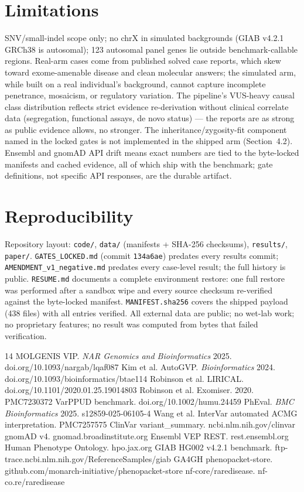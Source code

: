 \documentclass[11pt]{article}
\begin{document}
\section{Limitations}
\label{sec:limits}
SNV/small-indel scope only; no chrX in simulated backgrounds (GIAB v4.2.1 GRCh38 is
autosomal); 123 autosomal panel genes lie outside benchmark-callable regions.
Real-arm cases come from published solved case reports, which skew toward
exome-amenable disease and clean molecular answers; the simulated arm, while built
on a real individual's background, cannot capture incomplete penetrance, mosaicism,
or regulatory variation. The pipeline's VUS-heavy causal class distribution reflects
strict evidence re-derivation without clinical correlate data (segregation,
functional assays, de novo status) --- the reports are as strong as public evidence
allows, no stronger. The inheritance/zygosity-fit component named in the locked
gates is not implemented in the shipped arm (Section~4.2). Ensembl and gnomAD API
drift means exact numbers are tied to the byte-locked manifests and cached evidence,
all of which ship with the benchmark; gate definitions, not specific API responses,
are the durable artifact.

\section{Reproducibility}
\label{sec:repro}
Repository layout: \texttt{code/}, \texttt{data/} (manifests + SHA-256 checksums),
\texttt{results/}, \texttt{paper/}. \texttt{GATES\_LOCKED.md} (commit
\texttt{134a6ae}) predates every results commit; \texttt{AMENDMENT\_v1\_negative.md}
predates every case-level result; the full history is public.
\texttt{RESUME.md} documents a complete environment restore: one full restore was
performed after a sandbox wipe and every source checksum re-verified against the
byte-locked manifest. \texttt{MANIFEST.sha256} covers the shipped payload (438
files) with all entries verified. All external data are public; no wet-lab work; no
proprietary features; no result was computed from bytes that failed verification.

\begin{thebibliography}{14}\small
{} MOLGENIS VIP. \emph{NAR Genomics and Bioinformatics} 2025.
doi.org/10.1093/nargab/lqaf087
 Kim et al. AutoGVP. \emph{Bioinformatics} 2024.
doi.org/10.1093/bioinformatics/btae114
 Robinson et al. LIRICAL. doi.org/10.1101/2020.01.25.19014803
 Robinson et al. Exomiser. 2020. PMC7230372
 VarPPUD benchmark. doi.org/10.1002/humu.24459
 PhEval. \emph{BMC Bioinformatics} 2025. s12859-025-06105-4
 Wang et al. InterVar automated ACMG interpretation. PMC7257575
 ClinVar variant\_summary. ncbi.nlm.nih.gov/clinvar
 gnomAD v4. gnomad.broadinstitute.org
 Ensembl VEP REST. rest.ensembl.org
 Human Phenotype Ontology. hpo.jax.org
 GIAB HG002 v4.2.1 benchmark.
ftp-trace.ncbi.nlm.nih.gov/ReferenceSamples/giab
 GA4GH phenopacket-store.
github.com/monarch-initiative/phenopacket-store
 nf-core/raredisease. nf-co.re/raredisease
\end{thebibliography}
\end{document}
